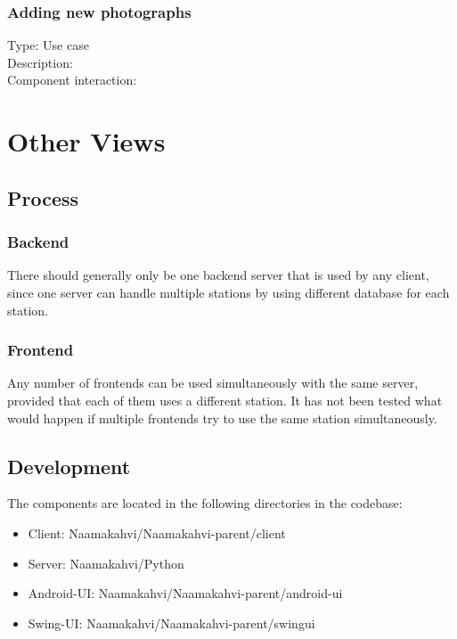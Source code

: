 \documentclass[11pt]{article}
\begin{document}
\subsubsection{Adding new photographs}
Type: Use case\\
Description:\\
Component interaction:\\

\section{Other Views}


\subsection{Process}
\subsubsection{Backend}
There should generally only be one backend server that is used by any
client, since one server can handle multiple stations by using
different database for each station.

\subsubsection{Frontend}
Any number of frontends can be used simultaneously with the same
server, provided that each of them uses a different station. It has
not been tested what would happen if multiple frontends try to use the
same station simultaneously.

\subsection{Development}

The components are located in the following directories in the codebase:
\begin{itemize}
\item Client: Naamakahvi/Naamakahvi-parent/client

\item Server: Naamakahvi/Python

\item Android-UI: Naamakahvi/Naamakahvi-parent/android-ui

\item Swing-UI: Naamakahvi/Naamakahvi-parent/swingui
\end{itemize}
\end{document}
